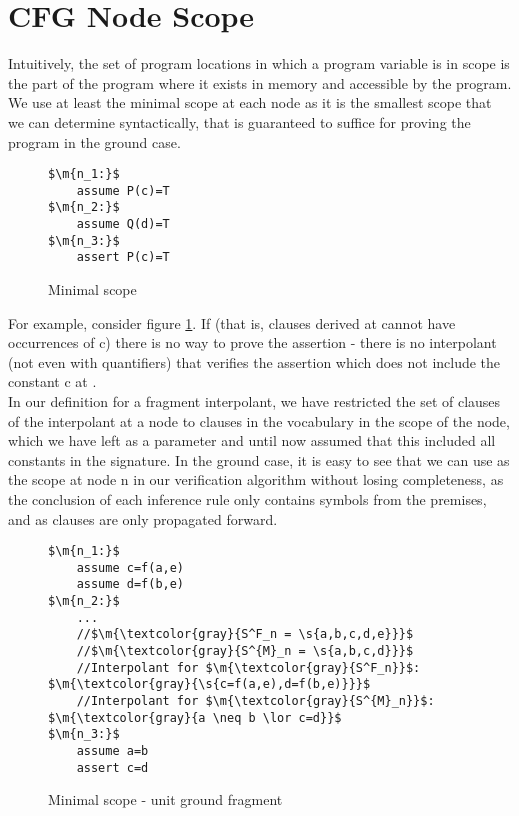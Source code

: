 \section{CFG Node Scope}\label{section:scoping:node_scope}
Intuitively, the set of program locations in which a program variable is in scope is the part of the program where it exists in memory and accessible by the program. We use at least the minimal scope at each node as it is the smallest scope that we can determine syntactically, that is guaranteed to suffice for proving the program in the ground case.

\begin{figure}
\begin{lstlisting}
$\m{n_1:}$
	assume P(c)=T
$\m{n_2:}$
	assume Q(d)=T
$\m{n_3:}$
	assert P(c)=T
\end{lstlisting}
\caption{Minimal scope}
\label{snippet4.2.1}
\end{figure}

For example, consider figure \ref{snippet4.2.1}.
If  (that is, clauses derived at  cannot have occurrences of c) there is no way to prove the assertion - there is no interpolant (not even with quantifiers) that verifies the assertion which does not include the constant c at .\\
In our definition for a fragment interpolant, we have restricted the set of clauses of the interpolant at a node to clauses in the vocabulary in the scope of the node, which we have left as a parameter and until now assumed that this included all constants in the signature. 
In the ground case, it is easy to see that we can use  as the scope at node n in our verification algorithm without losing completeness, as the conclusion of each inference rule only contains symbols from the premises, and as clauses are only propagated forward.

\begin{figure}
\begin{lstlisting}
$\m{n_1:}$
	assume c=f(a,e)
	assume d=f(b,e)
$\m{n_2:}$
	...
	//$\m{\textcolor{gray}{S^F_n = \s{a,b,c,d,e}}}$
	//$\m{\textcolor{gray}{S^{M}_n = \s{a,b,c,d}}}$
	//Interpolant for $\m{\textcolor{gray}{S^F_n}}$: $\m{\textcolor{gray}{\s{c=f(a,e),d=f(b,e)}}}$
	//Interpolant for $\m{\textcolor{gray}{S^{M}_n}}$: $\m{\textcolor{gray}{a \neq b \lor c=d}}$
$\m{n_3:}$
	assume a=b
	assert c=d
\end{lstlisting}
\caption{Minimal scope - unit ground fragment}
\label{snippet4.2.2}
\end{figure}

